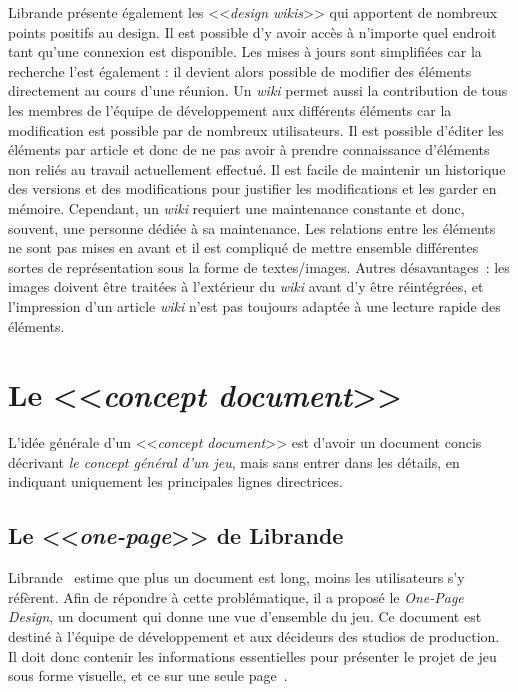 Librande présente également les <<\emph{design wikis}>> qui apportent de nombreux points positifs au design.
Il est possible d'y avoir accès à n'importe quel endroit tant qu'une connexion est disponible.
Les mises à jours sont simplifiées car la recherche l'est également : il devient alors possible de modifier des éléments directement au cours d'une réunion.
Un \emph{wiki} permet aussi la contribution de tous les membres de l'équipe de développement aux différents éléments car la modification est possible par de nombreux utilisateurs.
Il est possible d'éditer les éléments par article et donc de ne pas avoir à prendre connaissance d'éléments non reliés au travail actuellement effectué.
Il est facile de maintenir un historique des versions et des modifications pour justifier les modifications et les garder en mémoire.
Cependant, un \emph{wiki} requiert une maintenance constante et donc, souvent, une personne dédiée à sa maintenance.
Les relations entre les éléments ne sont pas mises en avant et il est compliqué de mettre ensemble différentes sortes de représentation sous la forme de textes/images.
Autres d\'esavantages~: les images doivent être traitées à l'extérieur du \emph{wiki} avant d'y être réintégrées, et l'impression d'un article \emph{wiki} n'est pas toujours adaptée à une lecture rapide des éléments.\\



\section{Le <<\emph{concept document}>>}

L'id\'ee g\'en\'erale d'un <<\emph{concept document}>> est
d'avoir un document concis décrivant \emph{le concept général d'un
jeu}, mais sans entrer dans les détails, en indiquant uniquement les
principales lignes directrices.


\subsection{Le <<\emph{one-page}>> de Librande}


Librande~\cite{onepage_librande} estime que plus un document est long, moins les utilisateurs s'y réfèrent.
Afin de répondre à cette problématique, il a propos\'e le \emph{One-Page Design},
un document qui donne une vue d'ensemble du jeu.
Ce document est destiné à l'équipe de développement et aux décideurs des studios de production.
Il doit donc contenir les informations essentielles pour présenter le projet de jeu sous forme visuelle, et ce sur une seule page~\cite{LevelUpRogers2014}.


